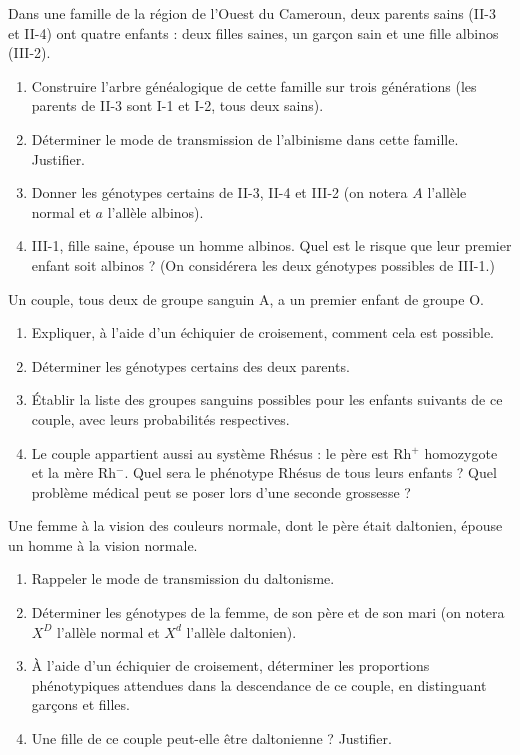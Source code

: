 \documentclass[11pt]{article}
\newcounter{popsec}
\newcounter{popsub}
\newcommand{\courssub}[1]{%
  \stepcounter{popsub}%
  \par\vspace{9pt}\noindent{\popxbold\fontsize{11.5}{13}\selectfont\color{popink}{\color{poporange}\thepopsec.\thepopsub}\hspace{6pt}#1}\par\nopagebreak\vspace{4pt}
}
\begin{document}
\courssub{Je m'entraîne}

\begin{exercice}
Dans une famille de la région de l'Ouest du Cameroun, deux parents sains (II-3 et II-4) ont quatre enfants : deux filles saines, un garçon sain et une fille albinos (III-2).
\begin{enumerate}
\item Construire l'arbre généalogique de cette famille sur trois générations (les parents de II-3 sont I-1 et I-2, tous deux sains).
\item Déterminer le mode de transmission de l'albinisme dans cette famille. Justifier.
\item Donner les génotypes certains de II-3, II-4 et III-2 (on notera $A$ l'allèle normal et $a$ l'allèle albinos).
\item III-1, fille saine, épouse un homme albinos. Quel est le risque que leur premier enfant soit albinos ? (On considérera les deux génotypes possibles de III-1.)
\end{enumerate}
\end{exercice}

\begin{exercice}
Un couple, tous deux de groupe sanguin A, a un premier enfant de groupe O.
\begin{enumerate}
\item Expliquer, à l'aide d'un échiquier de croisement, comment cela est possible.
\item Déterminer les génotypes certains des deux parents.
\item Établir la liste des groupes sanguins possibles pour les enfants suivants de ce couple, avec leurs probabilités respectives.
\item Le couple appartient aussi au système Rhésus : le père est Rh$^{+}$ homozygote et la mère Rh$^{-}$. Quel sera le phénotype Rhésus de tous leurs enfants ? Quel problème médical peut se poser lors d'une seconde grossesse ?
\end{enumerate}
\end{exercice}

\begin{exercice}
Une femme à la vision des couleurs normale, dont le père était daltonien, épouse un homme à la vision normale.
\begin{enumerate}
\item Rappeler le mode de transmission du daltonisme.
\item Déterminer les génotypes de la femme, de son père et de son mari (on notera $X^{D}$ l'allèle normal et $X^{d}$ l'allèle daltonien).
\item À l'aide d'un échiquier de croisement, déterminer les proportions phénotypiques attendues dans la descendance de ce couple, en distinguant garçons et filles.
\item Une fille de ce couple peut-elle être daltonienne ? Justifier.
\end{enumerate}
\end{exercice}
\end{document}
